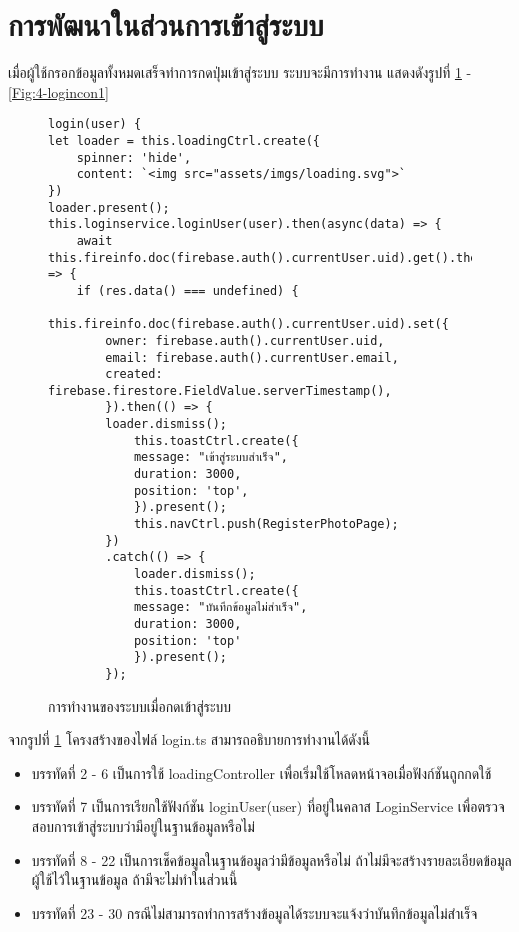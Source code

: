 \section{การพัฒนาในส่วนการเข้าสู่ระบบ}
เมื่อผู้ใช้กรอกข้อมูลทั้งหมดเสร็จทำการกดปุ่มเข้าสู่ระบบ ระบบจะมีการทำงาน แสดงดังรูปที่ \ref{Fig:4-login} - \ref{Fig:4-logincon1}

\begin{figure}[H]
{\lstset{language=Pascal}
\begin{lstlisting}
login(user) {
let loader = this.loadingCtrl.create({
	spinner: 'hide',
	content: `<img src="assets/imgs/loading.svg">`
})
loader.present();
this.loginservice.loginUser(user).then(async(data) => {
	await this.fireinfo.doc(firebase.auth().currentUser.uid).get().then((res) => {
	if (res.data() === undefined) {
		this.fireinfo.doc(firebase.auth().currentUser.uid).set({
		owner: firebase.auth().currentUser.uid,
		email: firebase.auth().currentUser.email,
		created: firebase.firestore.FieldValue.serverTimestamp(),
		}).then(() => {
		loader.dismiss();
			this.toastCtrl.create({
			message: "เข้าสู่ระบบสำเร็จ",
			duration: 3000,
			position: 'top',
			}).present();
			this.navCtrl.push(RegisterPhotoPage);
		})
		.catch(() => {
			loader.dismiss();
			this.toastCtrl.create({
			message: "บันทึกข้อมูลไม่สำเร็จ",
			duration: 3000,
			position: 'top'
			}).present();
		});
\end{lstlisting}}
\caption{การทำงานของระบบเมื่อกดเข้าสู่ระบบ}
\label{Fig:4-login}
\end{figure}
\newpage

จากรูปที่ \ref{Fig:4-login} โครงสร้างของไฟล์ login.ts สามารถอธิบายการทำงานได้ดังนี้
\begin{itemize}[label={--}]
\item บรรทัดที่ 2 - 6 เป็นการใช้ loadingController เพื่อเริ่มใช้โหลดหน้าจอเมื่อฟังก์ชันถูกกดใช้
\item บรรทัดที่ 7 เป็นการเรียกใช้ฟังก์ชัน loginUser(user) ที่อยู่ในคลาส LoginService เพื่อตรวจสอบการเข้าสู่ระบบว่ามีอยู่ในฐานข้อมูลหรือไม่
\item บรรทัดที่ 8 - 22 เป็นการเช็คข้อมูลในฐานข้อมูลว่ามีข้อมูลหรือไม่ ถ้าไม่มีจะสร้างรายละเอียดข้อมูลผู้ใช้ไว้ในฐานข้อมูล ถ้ามีจะไม่ทำในส่วนนี้
\item บรรทัดที่ 23 - 30 กรณีไม่สามารถทำการสร้างข้อมูลได้ระบบจะแจ้งว่าบันทึกข้อมูลไม่สำเร็จ 
\end{itemize}
\newpage



